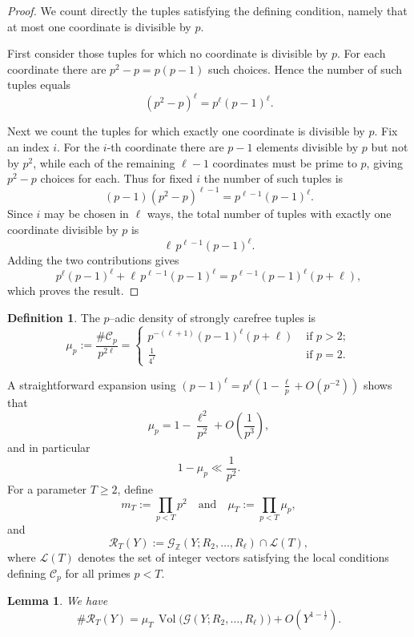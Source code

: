 \documentclass{amsart}
\theoremstyle{plain}
\newtheorem{lemma}[theorem]{Lemma}
\theoremstyle{definition}
\newtheorem{definition}[theorem]{Definition}
\theoremstyle{remark}
\numberwithin{equation}{section}
\begin{document}
\begin{proof}
We count directly the tuples satisfying the defining condition, namely that at most one coordinate is divisible by $p$.
\par First consider those tuples for which no coordinate is divisible by $p$. For each coordinate there are $p^2-p = p(p-1)$ such choices. Hence the number of such tuples equals
\[
(p^2-p)^\ell = p^\ell (p-1)^\ell.
\]
\par Next we count the tuples for which exactly one coordinate is divisible by $p$. Fix an index $i$. For the $i$-th coordinate there are $p-1$ elements divisible by $p$ but not by $p^2$, while each of the remaining $\ell-1$ coordinates must be prime to $p$, giving $p^2-p$ choices for each. Thus for fixed $i$ the number of such tuples is
\[
(p-1)(p^2-p)^{\ell-1} = p^{\ell-1}(p-1)^\ell.
\]
Since $i$ may be chosen in $\ell$ ways, the total number of tuples with exactly one coordinate divisible by $p$ is
\[
\ell\, p^{\ell-1}(p-1)^\ell.
\]
\noindent Adding the two contributions gives
\[
p^\ell (p-1)^\ell + \ell\, p^{\ell-1}(p-1)^\ell
= p^{\ell-1}(p-1)^\ell (p+\ell),
\]
which proves the result.
\end{proof}
\begin{definition}
The $p$–adic density of strongly carefree tuples is
\[
\mu_p:=\frac{\#\mathcal C_p}{p^{2\ell}}
=
\begin{cases}
p^{-(\ell+1)}(p-1)^\ell(p+\ell)&\text{ if }p>2;\\
\frac{1}{4^\ell}&\text{ if }p=2.
\end{cases}
\]
\end{definition}
\noindent A straightforward expansion using
\(
(p-1)^\ell
=
p^\ell\!\left(1-\frac{\ell}{p}+O(p^{-2})\right)
\)
shows that
\[
\mu_p
=
1-\frac{\ell^2}{p^2}
+
O\!\left(\frac1{p^3}\right),
\]
and in particular
\[
1-\mu_p \ll \frac1{p^2}.
\]For a parameter $T\ge 2$, define
\[
m_T := \prod_{p<T} p^2
\quad\text{and}\quad
\mu_T := \prod_{p<T}\mu_p,
\]
and
\[
\mathcal R_T(Y)
:=
\mathcal G_{\mathbb Z}(Y;R_2,\dots,R_\ell)
\cap
\mathcal L(T),
\]
where $\mathcal L(T)$ denotes the set of integer vectors satisfying the local conditions defining $\mathcal C_p$ for all primes $p<T$.

\begin{lemma}\label{lem:finite-sieve-general}
We have
\[
\#\mathcal R_T(Y)
=
\mu_T\,
\operatorname{Vol}\!\bigl(
\mathcal G(Y;R_2,\dots,R_\ell)
\bigr)
+
O\!\left(
Y^{1-\frac{1}{\ell}}
\right).
\]
\end{lemma}
\end{document}
